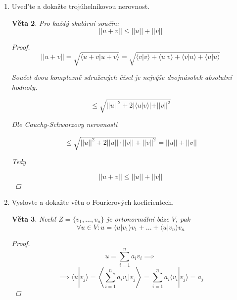 \documentclass[10pt,a4paper]{article}
\theoremstyle{plain}
\newtheorem{veta}{Věta}
\begin{document}
\begin{enumerate}
\begin{veta}
\begin{proof}
Pro odečtení posledních dvou členů zvolme $a = - \frac{\langle u|v \rangle}{\langle v|v \rangle}$

Dostaneme 
\begin{align*}
0 &\leq \langle u|u \rangle  - \frac{\langle u|v \rangle}{\langle v|v \rangle} \langle v|u \rangle \\
 \frac{\langle u|v \rangle}{\langle v|v \rangle} \langle v|u \rangle  &\leq \langle u|u \rangle \\
 \langle u|v \rangle \langle v|u \rangle  &\leq \langle u|u \rangle  \langle v|v \rangle \\
 \langle u|v \rangle^2   &\leq ||u||^2 \cdot ||v||^2 \\
  \langle u|v \rangle   &\leq ||u|| \cdot ||v|| 
\end{align*}

\end{proof}
\end{veta}

\item Uved'te a dokažte trojúhelníkovou nerovnost.
\begin{veta}
Pro každý skalární součin:
\[ ||u+v|| \leq ||u|| + ||v|| \]
\begin{proof}
\[  ||u+v||  = \sqrt{\langle u +v | u + v \rangle} =
 \sqrt{\langle v | v \rangle + \langle u | v \rangle + \langle v | u \rangle + \langle u | u \rangle}\]
 
Součet dvou komplexně sdružených čísel je nejvýše dvojnásobek absolutní hodnoty.
 
 \[ \leq  \sqrt{||u||^2 + 2 |\langle u | v \rangle | +  ||v||^2}   \]
 
 Dle Cauchy-Schwarzovy nerovnosti
 
  \[ \leq  \sqrt{||u||^2 + 2 ||u|| \cdot ||v|| +  ||v||^2} = ||u|| + ||v||  \]
  
  Tedy 
  
  \[ ||u+v|| \leq ||u|| + ||v||  \]
\end{proof}
\end{veta}

\item Vyslovte a dokažte větu o Fourierových koeficientech.
\begin{veta}
Nechť $Z = \{v_1, ..., v_n\}$ je ortonormální báze $V$, pak
\[\forall u \in V: u = \langle u | v_1 \rangle v_1 + ... +  \langle u | v_n \rangle v_n \]
\begin{proof}
\[ u = \sum^n_{i=1} a_i v_i \implies\]
\[\implies  \langle u | v_j \rangle =  \left\langle \sum^n_{i=1} a_i v_i  | v_j \right\rangle = \sum^n_{i=1} a_i \langle  v_i  | v_j \rangle = a_j \]
\end{proof}
\end{veta}


\end{enumerate}
\end{document}

